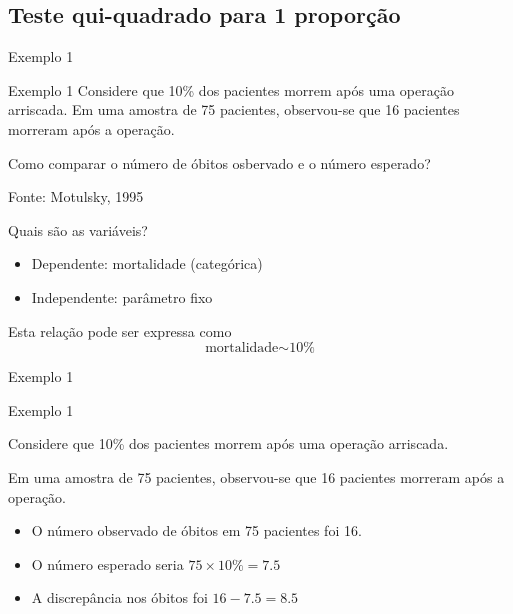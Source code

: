 \documentclass{beamer}
\begin{document}
\subsection{Teste qui-quadrado para 1 proporção}

\begin{frame}{\scriptsize Exemplo 1}
  \begin{exampleblock}{Exemplo 1}
    \footnotesize
    Considere que 10\% dos pacientes morrem após uma operação
    arriscada. Em uma amostra de 75 pacientes, observou-se que 16
    pacientes morreram após a operação.

    \bigskip
    Como comparar o número de óbitos osbervado e o número esperado?

    \bigskip
    {\hfill \tiny Fonte: Motulsky, 1995}
  \end{exampleblock}
\end{frame}

\begin{frame}{\scriptsize Quais são as variáveis?}
  \begin{itemize}
    \footnotesize
  \item Dependente: mortalidade (categórica)
  \item Independente: parâmetro fixo
  \end{itemize}
  \vfill
  \begin{block}{Esta relação pode ser expressa como}
    \begin{displaymath}
      \text{mortalidade} \sim \text{10\%}
    \end{displaymath}
  \end{block}
\end{frame}

\begin{frame}{Exemplo 1}
  \begin{exampleblock}{Exemplo 1}
    \footnotesize

    Considere que 10\% dos pacientes morrem após uma operação
    arriscada.

    Em uma amostra de 75 pacientes, observou-se que 16 pacientes
    morreram após a operação.
  \end{exampleblock}
  \bigskip
  \begin{itemize}
    \footnotesize
  \item<1-> O número observado de óbitos em 75 pacientes foi 16.
  \item<2-> O número esperado seria $75 \times 10\% = 7.5$
  \item<3-> A discrepância nos óbitos foi $16-7.5 = 8.5$
  \end{itemize}
\end{frame}
\end{document}
